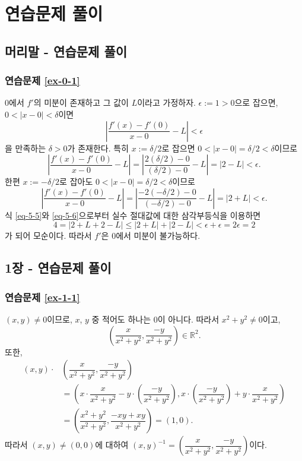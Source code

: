 
\chapter*{연습문제 풀이}

\section*{머리말 - 연습문제 풀이}

\subsection*{연습문제 \ref{ex-0-1}}

$0$에서 $f'$의 미분이 존재하고 그 값이 $L$이라고 가정하자.
$\epsilon:=1>0$으로 잡으면, $0<|x-0|<\delta$이면
\[
\left| \dfrac{f'(x) - f'(0)}{x-0} - L\right| <\epsilon
\]
을 만족하는 $\delta>0$가 존재한다.
특히 $x:=\delta/2$로 잡으면
$0<|x-0| = \delta/2 < \delta$이므로
\begin{equation} \label{eq-5-5}
\left| \dfrac{f'(x) - f'(0)}{x-0} - L\right|
= \left| \dfrac{2(\delta/2) - 0}{(\delta/2)-0} - L\right| 
= |2-L| < \epsilon.
\end{equation}
한편 $x:=-\delta/2$로 잡아도
$0<|x-0| = \delta/2 < \delta$이므로
\begin{equation} \label{eq-5-6}
\left| \dfrac{f'(x) - f'(0)}{x-0} - L\right|
= \left| \dfrac{-2(-\delta/2) - 0}{(-\delta/2)-0} - L\right| 
= |2+L| < \epsilon.
\end{equation}
식 \eqref{eq-5-5}와 \eqref{eq-5-6}으로부터
실수 절대값에 대한 삼각부등식을  이용하면
\[
4 = |2+L+2-L| \le |2+L| + |2-L|
<\epsilon + \epsilon = 2\epsilon = 2
\]
가 되어 모순이다.
따라서 $f'$은 $0$에서 미분이 불가능하다.

\section*{1장 - 연습문제 풀이}

\subsection*{연습문제 \ref{ex-1-1}}

$(x,y) \ne 0$이므로, 
$x$, $y$ 중 적어도 하나는 $0$이 아니다.
따라서 $x^2+y^2\ne 0$이고,
\[
\left( \dfrac x{x^2+y^2}, \dfrac{-y}{x^2+y^2} \right) \in \mathbb R^2.
\]
또한,
\begin{align*}
(x,y) \cdot & \left( \dfrac x{x^2+y^2}, \dfrac{-y}{x^2+y^2} \right) \\
&=\left( x\cdot \dfrac x{x^2+y^2} - y\cdot \left( \dfrac{-y}{x^2+y^2} \right),
x\cdot \left(\dfrac{-y}{x^2+y^2}\right) + y\cdot  \dfrac{x}{x^2+y^2} \right) \\
&= \left( \dfrac{x^2+y^2}{x^2+y^2}, \dfrac{-xy + xy}{x^2+y^2} \right) = (1,0).
\end{align*}
따라서 $(x,y) \ne(0,0)$에 대하여
$
(x,y)^{-1} = \left(\dfrac x{x^2+y^2}, \dfrac{-y}{x^2+y^2} \right)
$이다.

